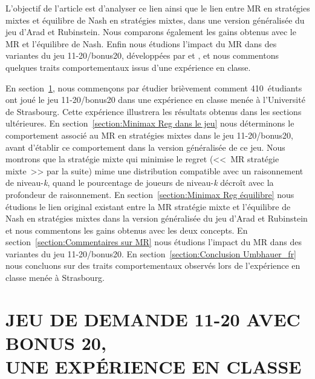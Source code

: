 \begin{Article}
\begin{refsection}[UmbhauerFR]
L'objectif de l'article est d'analyser ce lien ainsi que le lien entre
MR en stratégies mixtes et équilibre de Nash en stratégies mixtes, dans
une version généralisée du jeu d'Arad et Rubinstein. Nous comparons
également les gains obtenus avec le MR et l'équilibre de Nash. Enfin
nous étudions l'impact du MR dans des variantes du jeu 11-20/bonus20,
développées par \textcite{arad2012} et \textcite{goeree2018}, et nous commentons quelques traits comportementaux issus d'une expérience en classe.

En section~\ref{section:Jeu de demande exp en classe}, nous commençons par étudier brièvement comment 410~étudiants ont joué le jeu 11-20/bonus20 dans une expérience en classe menée à l'Université de Strasbourg. Cette expérience illustrera les
résultats obtenus dans les sections ultérieures. En section~\ref{section:Minimax Reg dans le jeu} nous
déterminons le comportement associé au MR en stratégies mixtes dans le
jeu 11-20/bonus20, avant d'établir ce comportement dans la version
généralisée de ce jeu. Nous montrons que la stratégie mixte qui minimise
le regret (<<~MR stratégie mixte~>> par la suite) mime une distribution
compatible avec un raisonnement de niveau-\emph{k}, quand le pourcentage
de joueurs de niveau-\emph{k} décroît avec la profondeur de
raisonnement. En section~\ref{section:Minimax Reg équilibre} nous étudions le lien original existant entre la MR stratégie mixte et l'équilibre de Nash en stratégies mixtes dans la version généralisée du jeu d'Arad et Rubinstein et nous commentons
les gains obtenus avec les deux concepts. En section~\ref{section:Commentaires sur MR} nous étudions l'impact du MR dans des variantes du jeu 11-20/bonus20. En section~\ref{section:Conclusion Umbhauer_fr} nous concluons sur des traits comportementaux observés lors de l'expérience en classe menée à Strasbourg.

\section{JEU DE DEMANDE 11-20 AVEC BONUS 20,\\ UNE EXPÉRIENCE EN CLASSE}
\label{section:Jeu de demande exp en classe}


\end{refsection}
\end{Article}
